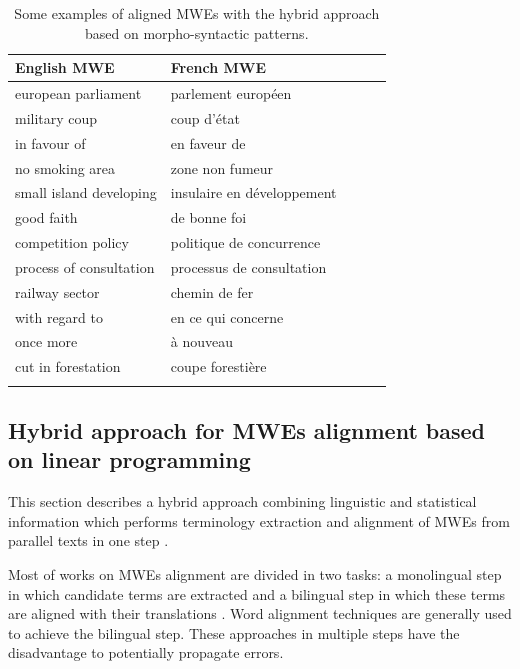 \documentclass[output=paper,modfonts,nonflat]{langsci/langscibook}
\begin{document}
\begin{table}
\caption{Some examples of aligned MWEs with the hybrid approach based on morpho-syntactic patterns.}
\label{MWEexamplesalignements}
 \begin{tabular}{lllll} 
  \lsptoprule
            English MWE& French MWE \\ 
  \midrule
						european parliament & parlement européen \\ 
            military coup & coup d'état \\
            in favour of &  en faveur de \\
            no smoking area & zone non fumeur \\
            small island developing & insulaire en développement \\
            good faith & de bonne foi \\
            competition policy & politique de concurrence \\
            process of consultation & processus de consultation \\
            railway sector & chemin de fer \\
            with regard to & en ce qui concerne \\
						once more & à nouveau \\
            cut in forestation & coupe forestière \\
  \lspbottomrule
 \end{tabular}
\end{table}


\subsection{Hybrid approach for MWEs alignment based on linear programming}
This section describes a hybrid approach combining linguistic and statistical information which performs terminology extraction and alignment of MWEs from parallel texts in one step \citep{marchandhybrid2011}. 

Most of works on MWEs alignment are divided in two tasks: a monolingual step in which candidate terms are extracted and a bilingual step in which these terms are aligned with their translations \citep{gaussier2011modeles}. Word alignment techniques are generally used to achieve the bilingual step. These approaches in multiple steps have the disadvantage to potentially propagate errors.
\end{document}
